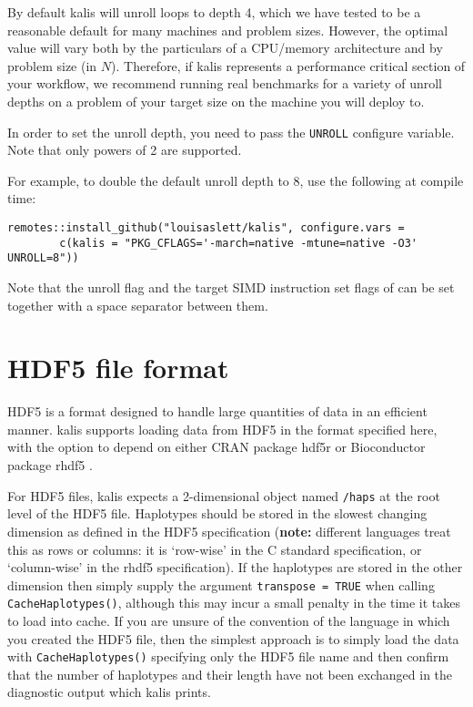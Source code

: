 \documentclass[a4paper]{article}
\let\proglang=\textsf
\newcommand{\pkg}[1]{{\fontseries{m}\fontseries{b}\selectfont #1}}
\begin{document}
By default \pkg{kalis} will unroll loops to depth 4, which we have tested to be a reasonable default for many machines and problem sizes.
However, the optimal value will vary both by the particulars of a CPU/memory architecture and by problem size (in \(N\)).
Therefore, if \pkg{kalis} represents a performance critical section of your workflow, we recommend running real benchmarks for a variety of unroll depths on a problem of your target size on the machine you will deploy to.

In order to set the unroll depth, you need to pass the \texttt{UNROLL} configure variable.
Note that only powers of 2 are supported.

For example, to double the default unroll depth to 8, use the following at compile time:

\begin{verbatim}
remotes::install_github("louisaslett/kalis", configure.vars =
        c(kalis = "PKG_CFLAGS='-march=native -mtune=native -O3' UNROLL=8"))
\end{verbatim}

%

Note that the unroll flag and the target SIMD instruction set flags of  can be set together with a space separator between them.



\section{HDF5 file format}
\label{apx:hdf5}

HDF5 \cite{hdf5} is a format designed to handle large quantities of data in an efficient manner.
\pkg{kalis} supports loading data from HDF5 in the format specified here, with the option to depend on either CRAN package \pkg{hdf5r} \cite{hdf5r} or Bioconductor \cite{bioc} package \pkg{rhdf5} \cite{rhdf5}.

For HDF5 files, \pkg{kalis} expects a 2-dimensional object named \texttt{/haps} at the root level of the HDF5 file.
Haplotypes should be stored in the slowest changing dimension as defined in the HDF5 specification (\textbf{note:} different languages treat this as rows or columns: it is `row-wise' in the \proglang{C} standard specification, or `column-wise' in the \pkg{rhdf5} specification).
If the haplotypes are stored in the other dimension then simply supply the argument \texttt{transpose\ =\ TRUE} when calling \texttt{CacheHaplotypes()}, although this may incur a small penalty in the time it takes to load into cache.
If you are unsure of the convention of the language in which you created the HDF5 file, then the simplest approach is to simply load the data with \texttt{CacheHaplotypes()} specifying only the HDF5 file name and then confirm that the number of haplotypes and their length have not been exchanged in the diagnostic output which \pkg{kalis} prints.
\end{document}
